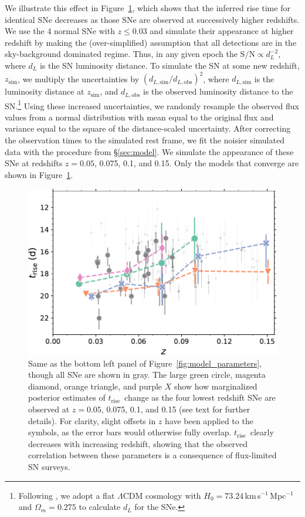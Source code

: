 \documentclass[twocolumn]{./aastex63}
\newcommand{\trise}{$t_\mathrm{rise}$}
\begin{document}
We illustrate this effect in Figure~\ref{fig:high_z_systematic}, which shows
that the inferred rise time for identical SNe decreases as those SNe are
observed at successively higher redshifts. We use the 4 normal SNe with $z \le
0.03$ and simulate their appearance at higher redshift by making the
(over-simplified) assumption that all detections are in the sky-background
dominated regime. Thus, in any given epoch the $\mathrm{S/N} \propto
d_L^{-2}$, where $d_L$ is the SN luminosity distance. To simulate the SN at
some new redshift, $z_\mathrm{sim}$, we multiply the uncertainties by
$(d_{L,\mathrm{sim}}/d_{L,\mathrm{obs}})^2$, where $d_{L,\mathrm{sim}}$ is the
luminosity distance at $z_\mathrm{sim}$, and $d_{L,\mathrm{obs}}$ is the
observed luminosity distance to the SN.\footnote{Following \citet{Yao19}, we
adopt a flat $\Lambda$CDM cosmology with $H_0 =
73.24$\,km\,s$^{-1}$\,Mpc$^{-1}$ \citep{Riess16} and $\Omega_m = 0.275$
\citep{Amanullah10} to calculate $d_L$ for the SNe.} Using these increased
uncertainties, we randomly resample the observed flux values from a normal
distribution with mean equal to the original flux and variance equal to the
square of the distance-scaled uncertainty. After correcting the observation
times to the simulated rest frame, we fit the noisier simulated data with the
procedure from \S\ref{sec:model}. We simulate the appearance of these SNe at
redshifts $z = 0.05$, 0.075, 0.1, and 0.15. Only the models that converge are
shown in Figure~\ref{fig:high_z_systematic}.

\begin{figure}
    \centering
    \includegraphics[width=1\linewidth]{./figures/high_z_systematic.pdf}
    \caption{Same as the bottom left panel of
    Figure~\ref{fig:model_parameters}, though all SNe are shown in gray. The
    large green circle, magenta diamond, orange triangle, and purple $X$ show
    how marginalized posterior estimates of \trise\ change as the four lowest
    redshift SNe are observed at $z = 0.05$, 0.075, 0.1, and 0.15 (see text
    for further details). For clarity, slight offsets in $z$ have been applied
    to the symbols, as the error bars would otherwise fully overlap. \trise\
    clearly decreases with increasing redshift, showing that the observed
    correlation between these parameters is a consequence of flux-limited SN
    surveys.}
    \label{fig:high_z_systematic}
\end{figure}
\end{document}
